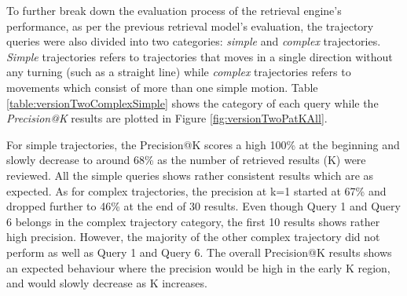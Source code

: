 To further break down the evaluation process of the retrieval engine's
performance, as per the previous retrieval model's evaluation, the trajectory
queries were also divided into two categories: \textit{simple} and
\textit{complex} trajectories. \textit{Simple} trajectories refers to
trajectories that moves in a single direction without any turning (such as a
straight line) while \textit{complex} trajectories refers to movements which
consist of more than one simple motion.
Table \ref{table:versionTwoComplexSimple} shows the category of each query while
the \textit{Precision@K} results are plotted in Figure
\ref{fig:versionTwoPatKAll}.

For simple trajectories, the Precision@K scores a high 100\% at the beginning
and slowly decrease to around 68\% as the number of retrieved results (K) were
reviewed. All the simple queries shows rather consistent results which are as
expected. As for complex trajectories, the precision at k=1 started at 67\% and
dropped further to 46\% at the end of 30 results. Even though Query 1 and Query
6 belongs in the complex trajectory category, the first 10 results shows rather
high precision. However, the majority of the other complex trajectory did not
perform as well as Query 1 and Query 6. The overall Precision@K results shows
an expected behaviour where the precision would be high in the early K region,
and would slowly decrease as K increases.

